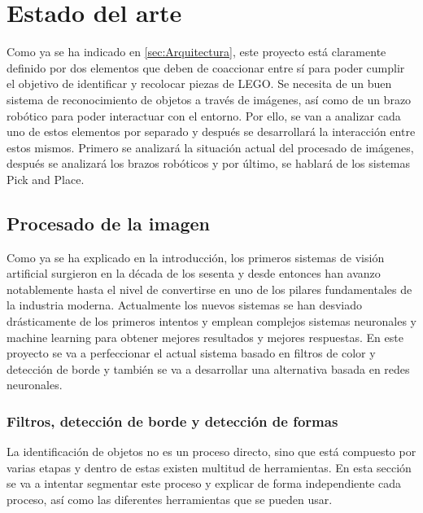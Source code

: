 \chapter{Estado del arte}
\label{chap:EstadoDelArte}

Como ya se ha indicado en \autoref{sec:Arquitectura}, este proyecto está claramente definido por dos elementos que deben de coaccionar entre sí para poder cumplir el objetivo de identificar y recolocar piezas de LEGO. Se necesita de un buen sistema de reconocimiento de objetos a través de imágenes, así como de un brazo robótico para poder interactuar con el entorno. Por ello, se van a analizar cada uno de estos elementos por separado y después se desarrollará la interacción entre estos mismos. Primero se analizará la situación actual del procesado de imágenes, después se analizará los brazos robóticos y por último, se hablará de los sistemas Pick and Place.

\section{Procesado de la imagen}
\label{sec:ProcesadoImagen}
Como ya se ha explicado en la introducción, los primeros sistemas de visión artificial surgieron en la década de los sesenta y desde entonces han avanzo notablemente hasta el nivel de convertirse en uno de los pilares fundamentales de la industria moderna. Actualmente los nuevos sistemas se han desviado drásticamente de los primeros intentos y emplean complejos sistemas neuronales y machine learning para obtener mejores resultados y mejores respuestas. En este proyecto se va a perfeccionar el actual sistema basado en filtros de color y detección de borde y también se va a desarrollar una alternativa basada en redes neuronales.

\subsection{Filtros, detección de borde y detección de formas}
\label{subsec:Filtros, detección de borde y detección de formas}
La identificación de objetos no es un proceso directo, sino que está compuesto por varias etapas y dentro de estas existen multitud de herramientas. En esta sección se va a intentar segmentar este proceso y explicar de forma independiente cada proceso, así como las diferentes herramientas que se pueden usar.

